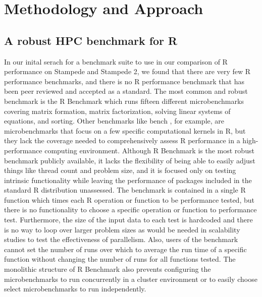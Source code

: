 \section{Methodology and Approach}\label{sec:methodology}

\subsection{A robust HPC benchmark for R}

In our inital serach for a benchmark suite to use in our comparison of R performance on
Stampede and Stampede 2, we found that there are very few R performance benchmarks, and
there is no R performance benchmark that has been peer reviewed and accepted as a
standard. The most common and robust benchmark is the R Benchmark
\cite{urbanek:Rbenchmarks} which runs fifteen different microbenchmarks covering matrix
formation, matrix factorization, solving linear systems of equations, and sorting. Other
benchmarks like bench \cite{urbanek:Rbenchmarks}, for example, are microbenchmarks that
focus on a few specific computational kernels in R, but they lack the coverage needed to
comprehensively assess R performance in a high-performance computing environment. Although
R Benchmark is the most robust benchmark publicly available, it lacks the flexibility of
being able to easily adjust things like thread count and problem size, and it is focused
only on testing intrinsic functionality while leaving the performance of packages included
in the standard R distribution unassessed.  The benchmark is contained in a single R
function which times each R operation or function to be performance tested, but there is
no functionality to choose a specific operation or function to performance test.
Furthermore, the size of the input data to each test is hardcoded and there is no way to
loop over larger problem sizes as would be needed in scalability studies to test the
effectiveness of parallelism. Also, users of the benchmark cannot set the number of runs
over which to average the run time of a specific function without changing the number of
runs for all functions tested. The monolithic structure of R Benchmark also prevents
configuring the microbenchmarks to run concurrently in a cluster environment or to easily
choose select microbenchmarks to run independently.

